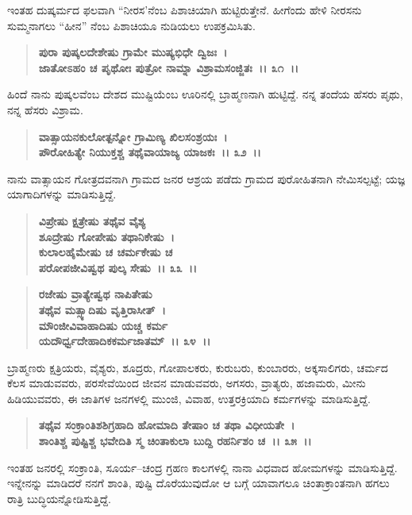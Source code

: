 ಇಂತಹ ದುಷ್ಕರ್ಮದ ಫಲವಾಗಿ “ನೀರಸ'ನೆಂಬ ಪಿಶಾಚಿಯಾಗಿ ಹುಟ್ಟಿರುತ್ತೇನೆ. ಹೀಗೆಂದು ಹೇಳಿ ನೀರಸನು ಸುಮ್ಮನಾಗಲು “ಹೀನ” ನೆಂಬ ಪಿಶಾಚಿಯೂ ನುಡಿಯಲು ಉಪಕ್ರಮಿಸಿತು.

\begin{verse}
\textbf{ಪುರಾ ಪುಷ್ಕಲದೇಶೇಷು ಗ್ರಾಮೇ ಮುಷ್ಯಭಿಧೇ ದ್ವಿಜಃ~।}\\\textbf{ಜಾತೋಽಹಂ ಚ ಪೃಥೋಃ ಪುತ್ರೋ ನಾಮ್ನಾ ವಿಶ್ರಾಮಸಂಜ್ಜಿತಃ~।। ೩೧~।।}
\end{verse}

ಹಿಂದೆ ನಾನು ಪುಷ್ಕಲವೆಂಬ ದೇಶದ ಮುಷ್ಟಿಯೆಂಬ ಊರಿನಲ್ಲಿ ಬ್ರಾಹ್ಮಣನಾಗಿ ಹುಟ್ಟಿದ್ದೆ. ನನ್ನ ತಂದೆಯ ಹೆಸರು ಪೃಥು, ನನ್ನ ಹೆಸರು ವಿಶ್ರಾಮ.

\begin{verse}
\textbf{ವಾತ್ಸಾಯನಕುಲೋತ್ಪನ್ನೋ ಗ್ರಾಮಿಣ್ಯ ಖಿಲಸಂಶ್ರಯಃ~।}\\\textbf{ಪೌರೋಹಿತ್ಯೇ ನಿಯುಕ್ತಶ್ಚ ತಥೈವಾಯಾಜ್ಯ ಯಾಜಕಃ~।। ೩೨~।।}
\end{verse}

ನಾನು ವಾತ್ಸಾಯನ ಗೋತ್ರದವನಾಗಿ ಗ್ರಾಮದ ಜನರ ಆಶ್ರಯ ಪಡೆದು ಗ್ರಾಮದ ಪುರೋಹಿತನಾಗಿ ನೇಮಿಸಲ್ಪಟ್ಟೆ; ಯಜ್ಞ ಯಾಗಾದಿಗಳನ್ನು ಮಾಡಿಸುತ್ತಿದ್ದೆ.

\begin{verse}
\textbf{ವಿಪ್ರೇಷು ಕ್ಷತ್ರೇಷು ತಥೈವ ವೈಶ್ಯ}\\\textbf{ಶೂದ್ರೇಷು ಗೋಪೇಷು ತಥಾನಿಕೇಷು~।}\\\textbf{ಕುಲಾಲಹೈಮೇಷು ಚ ಚರ್ಮಕೇಷು ಚ} \\\textbf{ಪರೋಪಜೀವಿಷ್ವಥ ಪುಲ್ಕ ಸೇಷು~।। ೩೩~।।}
\end{verse}

\begin{verse}
\textbf{ರಜೇಷು ವ್ರಾತ್ಯೇಷ್ವಥ ನಾಪಿತೇಷು}\\\textbf{ತಥೈವ ಮತ್ಸ್ಯಾದಿಷು ವೃತ್ತಿರಾಸೀತ್~।}\\\textbf{ಮೌಂಜೀವಿವಾಹಾದಿಷು ಯಚ್ಚ ಕರ್ಮ}\\\textbf{ಯದೌರ್ಧ್ವದೇಹಾದಿಕಕರ್ಮಜಾತಮ್~।। ೩೪~।।}
\end{verse}

ಬ್ರಾಹ್ಮಣರು ಕ್ಷತ್ರಿಯರು, ವೈಶ್ಯರು, ಶೂದ್ರರು, ಗೋಪಾಲಕರು, ಕುರುಬರು, ಕುಂಬಾರರು, ಅಕ್ಕಸಾಲಿಗರು, ಚರ್ಮದ ಕೆಲಸ ಮಾಡುವವರು, ಪರಸೇವೆಯಿಂದ ಜೀವನ ಮಾಡುವವರು, ಅಗಸರು, ವ್ರಾತ್ಯರು, ಹಜಾಮರು, ಮೀನು ಹಿಡಿಯುವವರು, ಈ ಜಾತಿಗಳ ಜನಗಳಲ್ಲಿ ಮುಂಜಿ, ವಿವಾಹ, ಉತ್ತರಕ್ರಿಯಾದಿ ಕರ್ಮಗಳನ್ನು ಮಾಡಿಸುತ್ತಿದ್ದೆ.

\begin{verse}
\textbf{ತಥೈವ ಸಂಕ್ರಾಂತಿಶಶಿಗ್ರಹಾದಿ ಹೋಮಾದಿ ತೇಷಾಂ ಚ ತಥಾ ವಿಧೀಯತೇ~।}\\\textbf{ಶಾಂತಿಶ್ಚ ಪುಷ್ಟಿಶ್ಚ ಭವೇದಿತಿ ಸ್ಮ ಚಿಂತಾಕುಲಾ ಬುದ್ದಿ ರಹರ್ನಿಶಂ ಚ~।। ೩೫~।।}
\end{verse}

ಇಂತಹ ಜನರಲ್ಲಿ ಸಂಕ್ರಾಂತಿ, ಸೂರ್ಯ–ಚಂದ್ರ ಗ್ರಹಣ ಕಾಲಗಳಲ್ಲಿ ನಾನಾ ವಿಧವಾದ ಹೋಮಗಳನ್ನು ಮಾಡಿಸುತ್ತಿದ್ದೆ. ಇನ್ನೇನನ್ನು ಮಾಡಿದರೆ ನನಗೆ ಶಾಂತಿ, ಪುಷ್ಟಿ ದೊರೆಯುವುದೋ ಆ ಬಗ್ಗೆ ಯಾವಾಗಲೂ ಚಿಂತಾಕ್ರಾಂತನಾಗಿ ಹಗಲು ರಾತ್ರಿ ಬುದ್ಧಿಯನ್ನೋಡಿಸುತ್ತಿದ್ದೆ.

